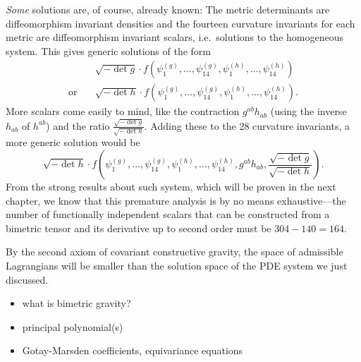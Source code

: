 \emph{Some} solutions are, of course, already known: The metric determinants are diffeomorphism invariant densities and the fourteen curvature invariants for each metric are diffeomorphism invariant scalars, i.e.~solutions to the homogeneous system. This gives generic solutions of the form
\begin{equation}
  \begin{aligned}
  {}& \sqrt{-\operatorname{det}g}\cdot f(\psi^{(g)}_1,\dots,\psi^{(g)}_{14},\psi^{(h)}_1,\dots,\psi^{(h)}_{14}) \\
    \text{or}\quad{}& \sqrt{-\operatorname{det}h}\cdot f(\psi^{(g)}_1,\dots,\psi^{(g)}_{14},\psi^{(h)}_1,\dots,\psi^{(h)}_{14}).
  \end{aligned}
\end{equation}
More scalars come easily to mind, like the contraction $g^{ab} h_{ab}$ (using the inverse $h_{ab}$ of $h^{ab}$) and the ratio $\frac{\sqrt{-\operatorname{det}g}}{\sqrt{-\operatorname{det}h}}$. Adding these to the 28 curvature invariants, a more generic solution would be
\begin{equation}
  \sqrt{-\operatorname{det}h}\cdot f(\psi^{(g)}_1,\dots,\psi^{(g)}_{14},\psi^{(h)}_1,\dots,\psi^{(h)}_{14},g^{ab}h_{ab}, \frac{\sqrt{-\operatorname{det}g}}{\sqrt{-\operatorname{det}h}}).
\end{equation}
From the strong results about such system, which will be proven in the next chapter, we know that this premature analysis is by no means exhaustive---the number of functionally independent scalars that can be constructed from a bimetric tensor and its derivative up to second order must be $304-140=164$.

By the second axiom of covariant constructive gravity, the space of admissible Lagrangians will be smaller than the solution space of the PDE system we just discussed.


\begin{itemize}
\item what is bimetric gravity?
\item principal polynomial(s)
\item Gotay-Marsden coefficients, equivariance equations
\end{itemize}


